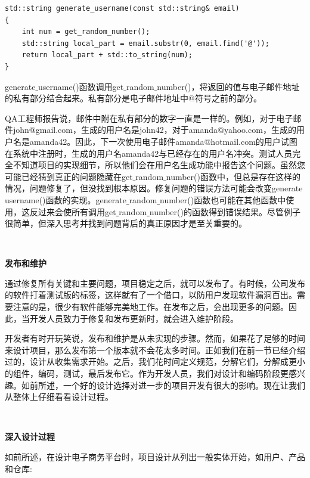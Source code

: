 \begin{lstlisting}[caption={}]
std::string generate_username(const std::string& email)
{
	int num = get_random_number();
	std::string local_part = email.substr(0, email.find('@'));
	return local_part + std::to_string(num);
}
\end{lstlisting}

generate\underline{ }username()函数调用get\underline{ }random\underline{ }number()，将返回的值与电子邮件地址的私有部分结合起来。私有部分是电子邮件地址中@符号之前的部分。 \par
QA工程师报告说，邮件中附在私有部分的数字一直是一样的。例如，对于电子邮件john@gmail.com，生成的用户名是john42，对于amanda@yahoo.com，生成的用户名是amanda42。因此，下一次使用电子邮件amanda@hotmail.com的用户试图在系统中注册时，生成的用户名amanda42与已经存在的用户名冲突。测试人员完全不知道项目的实现细节，所以他们会在用户名生成功能中报告这个问题。虽然您可能已经猜到真正的问题隐藏在get\underline{ }random\underline{ }number()函数中，但总是存在这样的情况，问题修复了，但没找到根本原因。修复问题的错误方法可能会改变generate\underline{ }username()函数的实现。generate\underline{ }random\underline{ }number()函数也可能在其他函数中使用，这反过来会使所有调用get\underline{ }random\underline{ }number()的函数得到错误结果。尽管例子很简单，但深入思考并找到问题背后的真正原因才是至关重要的。 \par

\noindent\textbf{}\ \par
\textbf{发布和维护} \ \par
通过修复所有关键和主要问题，项目稳定之后，就可以发布了。有时候，公司发布的软件打着测试版的标签，这样就有了一个借口，以防用户发现软件漏洞百出。需要注意的是，很少有软件能够完美地工作。在发布之后，会出现更多的问题。因此，当开发人员致力于修复和发布更新时，就会进入维护阶段。 \par
开发者有时开玩笑说，发布和维护是从未实现的步骤。然而，如果花了足够的时间来设计项目，那么发布第一个版本就不会花太多时间。正如我们在前一节已经介绍过的，设计从收集需求开始。之后，我们花时间定义规范，分解它们，分解成更小的组件，编码，测试，最后发布它。作为开发人员，我们对设计和编码阶段更感兴趣。如前所述，一个好的设计选择对进一步的项目开发有很大的影响。现在让我们从整体上仔细看看设计过程。 \par

\noindent\textbf{}\ \par
\textbf{深入设计过程} \ \par
如前所述，在设计电子商务平台时，项目设计从列出一般实体开始，如用户、产品和仓库: \par

